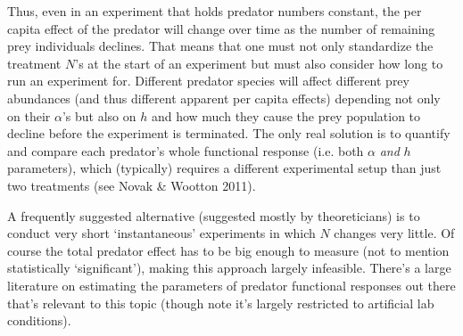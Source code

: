 \documentclass[10pt,letterpaper]{article}
\begin{document}
Thus, even in an experiment that holds predator numbers constant, the per capita effect of the predator will change over time as the number of remaining prey individuals declines.  That means that one must not only standardize the treatment $N$'s at the start of an experiment but must also consider how long to run an experiment for.  Different predator species will affect different prey abundances (and thus different apparent per capita effects) depending not only on their $\alpha$'s but also on $h$ and how much they cause the prey population to decline before the experiment is terminated.  The only real solution is to quantify and compare each predator's whole functional response (i.e. both $\alpha$ \emph{and} $h$ parameters), which (typically) requires a different experimental setup than just two treatments (see Novak \& Wootton 2011). 

A frequently suggested alternative (suggested mostly by theoreticians) is to conduct very short `instantaneous' experiments in which $N$ changes very little.  Of course the total predator effect has to be big enough to measure (not to mention statistically `significant'), making this approach largely infeasible.  There's a large literature on estimating the parameters of predator functional responses out there that's relevant to this topic (though note it's largely restricted to artificial lab conditions).
\end{document}
